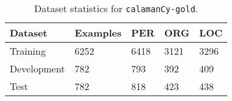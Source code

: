 \documentclass[../emnlp.tex]{subfiles}
\begin{document}
\begin{table}[t]
\begin{tabular}{@{}lllll@{}}
\toprule
Dataset     & Examples & PER  & ORG  & LOC  \\ \midrule
Training    & 6252     & 6418 & 3121 & 3296 \\
Development & 782      & 793  & 392  & 409  \\
Test        & 782      & 818  & 423  & 438  \\ \bottomrule
\end{tabular}
\caption{Dataset statistics for \texttt{calamanCy-gold}.}
\label{table:dset_stats}
\end{table}
\end{document}
